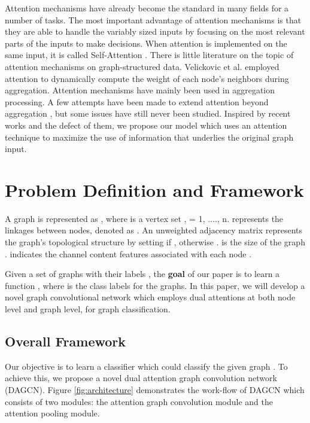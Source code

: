 \documentclass[conference]{IEEEtran}
\begin{document}
        Attention mechanisms have already become the standard in many fields for a number of tasks\cite{bahdanau2014neural,shen2017disan}. The most important advantage of attention mechanisms is that they are able to handle the variably sized inputs by focusing on the most relevant parts of the inputs to make decisions. When attention is implemented on the same input, it is called Self-Attention \cite{lin2017structured}. There is little literature on the topic of attention mechanisms on graph-structured data. Velickovic et al.\cite{velickovic2017graph} employed attention to dynamically compute the weight of each node's neighbors during aggregation. Attention mechanisms have mainly been used in aggregation processing. A few attempts have been made to extend attention beyond aggregation \cite{lee2018graph,abu2018watch}, but some issues have still never been studied. Inspired by recent works and the defect of them, we propose our model which uses an attention technique to maximize the use of information that underlies the original graph input.
	
	\section{Problem Definition and Framework}
	   A graph is represented as , where  is a vertex set {},  = 1, ...., n.  represents the linkages between nodes, denoted as . An unweighted adjacency matrix  represents the graph's topological structure by setting  if , otherwise .  is the size of the graph .  indicates the  channel content features associated with each node .
	    
	   Given a set of graphs  with their labels , the \textbf{goal} of our paper is to learn a function , where  is the class labels for the graphs. In this paper, we will develop a novel graph convolutional network which employs dual attentions at both node level and graph level, for graph classification.
	   
	   \subsection{Overall Framework}
	   Our objective is to learn a classifier which could classify the given graph . To achieve this, we propose a novel dual attention graph convolution network (DAGCN). Figure \ref{fig:architecture} demonstrates the work-flow of DAGCN which consists of two modules: the attention graph convolution module and the attention pooling module.
	   
\end{document}
